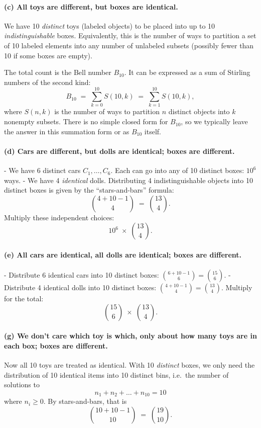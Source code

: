 \documentclass[docmute]{article}
\begin{document}
\paragraph{(c) All toys are different, but boxes are identical.}
We have 10 \emph{distinct} toys (labeled objects) to be placed into up to 10 \emph{indistinguishable} boxes. Equivalently, this is the number of ways to partition a set of 10 labeled elements into any number of unlabeled subsets (possibly fewer than 10 if some boxes are empty).

The total count is the Bell number \(B_{10}\). It can be expressed as a sum of Stirling numbers of the second kind:
\[
B_{10}
\;=\;
\sum_{k=0}^{10} S(10,k)
\;=\;
\sum_{k=1}^{10} S(10,k),
\]
where \(S(n,k)\) is the number of ways to partition \(n\) distinct objects into \(k\) nonempty subsets. There is no simple closed form for \(B_{10}\), so we typically leave the answer in this summation form or as \(B_{10}\) itself.

\paragraph{(d) Cars are different, but dolls are identical; boxes are different.}
- We have 6 distinct cars \(C_1,\ldots,C_6\). Each can go into any of 10 distinct boxes: \(10^6\) ways.
- We have 4 \emph{identical} dolls. Distributing 4 indistinguishable objects into 10 distinct boxes is given by the ``stars-and-bars'' formula:
  \[
  \binom{4 + 10 - 1}{4} \;=\;\binom{13}{4}.
  \]
Multiply these independent choices:
\[
10^6 \;\times\; \binom{13}{4}.
\]

\paragraph{(e) All cars are identical, all dolls are identical; boxes are different.}
- Distribute 6 identical cars into 10 distinct boxes: \(\displaystyle \binom{6 + 10 - 1}{6} = \binom{15}{6}.\)
- Distribute 4 identical dolls into 10 distinct boxes: \(\displaystyle \binom{4 + 10 - 1}{4} = \binom{13}{4}.\)
Multiply for the total:
\[
\binom{15}{6} \;\times\; \binom{13}{4}.
\]


\paragraph{(g) We don’t care which toy is which, only about how many toys are in each box; boxes are different.}
Now all 10 toys are treated as identical. With 10 \emph{distinct} boxes, we only need the distribution of 10 identical items into 10 distinct bins, i.e.\ the number of solutions to
\[
n_1 + n_2 + \dots + n_{10} = 10
\]
where \(n_i \ge 0\). By stars-and-bars, that is
\[
\binom{10 + 10 - 1}{10} \;=\;\binom{19}{10}.
\]
\end{document}
